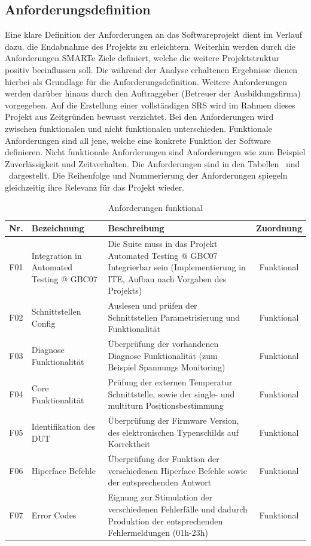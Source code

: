 \subsection{Anforderungsdefinition}\label{sec:Anforderungsdefinition}
Eine klare Definition der Anforderungen an das Softwareprojekt dient im Verlauf dazu. die Endabnahme des Projekts zu erleichtern. Weiterhin werden durch die Anforderungen SMARTe \cite{Dr.WolfgangSchroder.2018} Ziele definiert, welche die weitere Projektstruktur positiv beeinflussen soll. 
Die während der Analyse erhaltenen Ergebnisse dienen hierbei als Grundlage für die Anforderungsdefinition. Weitere Anforderungen werden darüber hinaus durch den Auftraggeber (Betreuer der Ausbildungsfirma) vorgegeben.  Auf die Erstellung einer vollständigen \ac{SRS} wird im Rahmen dieses Projekt aus Zeitgründen bewusst verzichtet. Bei den Anforderungen wird zwischen funktionalen und nicht funktionalen unterschieden. Funktionale Anforderungen sind all jene, welche eine konkrete Funktion der Software definieren. Nicht funktionale Anforderungen sind Anforderungen wie zum Beispiel Zuverlässigkeit und Zeitverhalten. Die Anforderungen sind in den Tabellen \dq {}\dq~und \dq {}\dq~dargestellt. Die Reihenfolge und Nummerierung der Anforderungen spiegeln gleichzeitig ihre Relevanz für das Projekt wieder.
\newpage
\begin{table}[h]
\begin{center}
\begin{tabularx}{\textwidth}{|c|X|X|c|}
\hline
Nr. & Bezeichnung & Beschreibung & Zuordnung \\
\hline
F01 &Integration in Automated Testing @ GBC07  & Die Suite muss in das Projekt Automated Testing @ GBC07 Integrierbar sein (Implementierung in ITE, Aufbau nach Vorgaben des Projekts) & Funktional \\
\hline
F02 & Schnittstellen Config & Auslesen und prüfen der Schnittstellen Parametrisierung und Funktionalität & Funktional \\
\hline
F03 & Diagnose Funktionalität & Überprüfung der vorhandenen Diagnose Funktionalität (zum Beispiel Spannungs Monitoring) & Funktional \\
\hline
F04 & Core Funktionalität & Prüfung der externen Temperatur Schnittstelle, sowie der single- und multiturn Positionsbestimmung & Funktional \\
\hline
F05 & Identifikation des DUT & Überprüfung der Firmware Version, des elektronischen Typenschilds auf Korrektheit & Funktional \\
\hline
F06 & Hiperface Befehle & Überprüfung der Funktion der verschiedenen Hiperface Befehle sowie der entsprechenden Antwort & Funktional \\
\hline
F07 & Error Codes & Eignung zur Stimulation der verschiedenen Fehlerfälle und  dadurch Produktion der entsprechenden Fehlermeldungen (01h-23h) & Funktional \\
\hline


\end{tabularx}
\end{center}
\caption{Anforderungen funktional \label{tab:Anforderungstabelle}}
\end{table}

